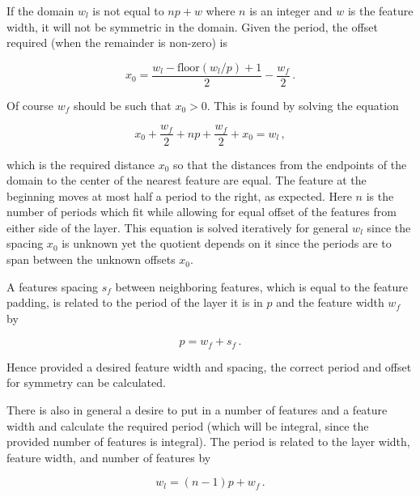 \documentclass{article}
\begin{document}
If the domain $w_l$ is not equal to $np + w$ where $n$ is an integer and $w$ is the feature width, it will not be symmetric in the domain. Given the period, the offset required (when the remainder is non-zero) is 

$$x_0 = \frac{w_l - \text{floor}(w_l / p) + 1}{2} - \frac{w_f}{2}\,. $$

Of course $w_f$ should be such that $x_0 > 0$. This is found by solving the equation

$$x_0 + \frac{w_f}{2} + np + \frac{w_f}{2} + x_0 = w_l\,, $$

which is the required distance $x_0$ so that the distances from the endpoints of the domain to the center of the nearest feature are equal. The feature at the beginning moves at most half a period to the right, as expected. Here $n$ is the number of periods which fit while allowing for equal offset of the features from either side of the layer. This equation is solved iteratively for general $w_l$ since the spacing $x_0$ is unknown yet the quotient depends on it since the periods are to span between the unknown offsets $x_0$.


A features spacing $s_f$ between neighboring features, which is equal to the feature padding, is related to the period of the layer it is in $p$ and the feature width $w_f$ by

$$p = w_f + s_f \,.$$

Hence provided a desired feature width and spacing, the correct period and offset for symmetry can be calculated.

There is also in general a desire to put in a number of features and a feature width and calculate the required period (which will be integral, since the provided number of features is integral). The period is related to the layer width, feature width, and number of features by

$$ w_l = (n-1)p + w_f\,. $$
\end{document}
